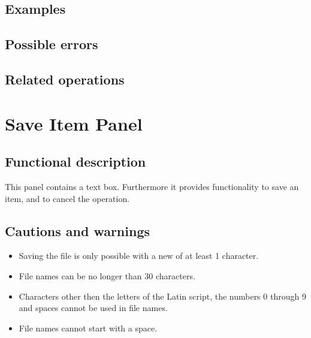   \subsection*{Examples}

  \subsection*{Possible errors}

  \subsection*{Related operations}

\section{Save Item Panel}
\label{sec:saveitem}
  \subsection*{Functional description}
  This panel contains a text box. Furthermore it provides functionality to save an item, and to cancel the operation.

  \subsection*{Cautions and warnings}
  \begin{itemize}
  \item Saving the file is only possible with a new of at least 1 character.
  \item File names can be no longer than 30 characters.
  \item Characters other then the letters of the Latin script, the numbers 0 through 9 and spaces cannot be used in file names.
  \item File names cannot start with a space.
  \end{itemize}

